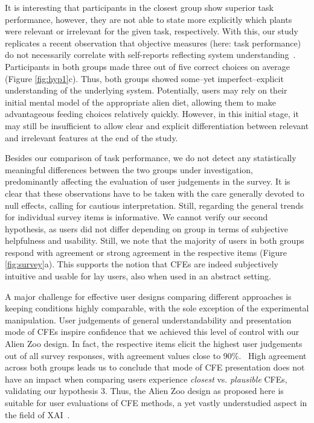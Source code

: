 It is interesting that participants in the closest group show superior task performance, however, they are not able to state more explicitly which plants were relevant or irrelevant for the given task, respectively. 
With this, our study replicates a recent observation that objective measures (here: task performance) do not necessarily correlate with self-reports reflecting system understanding~\citep{van_der_waa_evaluating_2021}.
Participants in both groups made three out of five correct choices on average (Figure \ref{fig:hyp1}c).
Thus, both groups showed some--yet imperfect--explicit understanding of the underlying system.
Potentially, users may rely on their initial mental model of the appropriate alien diet, allowing them to make advantageous feeding choices relatively quickly. However, in this initial stage, it may still be insufficient to allow clear and explicit differentiation between relevant and irrelevant features at the end of the study.

Besides our comparison of task performance, we do not detect any statistically meaningful differences between the two groups under investigation, predominantly affecting the evaluation of user judgements in the survey. 
It is clear that these observations have to be taken with the care generally devoted to null effects, calling for cautious interpretation. 
Still, regarding the general trends for individual survey items is informative.
We cannot verify our second hypothesis, as users did not differ depending on group in terms of subjective helpfulness and usability. 
Still, we note that the majority of users in both groups respond with agreement or strong agreement in the respective items (Figure \ref{fig:survey}a).
This supports the notion that \glspl{CFE} are indeed subjectively intuitive and usable for lay users, also when used in an abstract setting.

A major challenge for effective user designs comparing different approaches is keeping conditions highly comparable, with the sole exception of the experimental manipulation.
User judgements of general understandability and presentation mode of \glspl{CFE} inspire confidence that we achieved this level of control with our Alien Zoo design. 
In fact, the respective items elicit the highest user judgements out of all survey responses, with agreement values close to 90\%.%
~High agreement across both groups leads us to conclude that mode of \gls{CFE} presentation does not have an impact when comparing users experience \textit{closest} vs. \textit{plausible} \glspl{CFE}, validating our hypothesis 3.
Thus, the Alien Zoo design as proposed here is suitable for user evaluations of \gls{CFE} methods, a yet vastly understudied aspect in the field of \gls{XAI}~\citep{keane_if_2021}.


